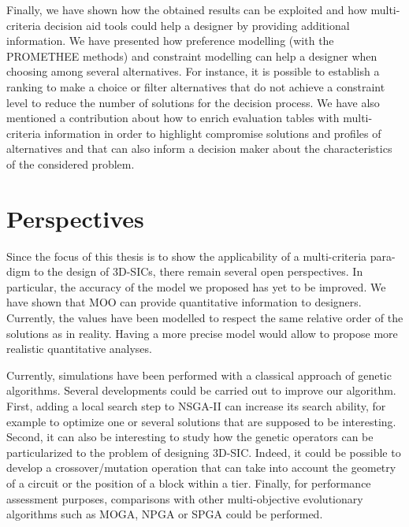 Finally, we have shown how the obtained results can be exploited and how multi-criteria decision aid tools could help a designer by providing additional information. We have presented how preference modelling (with the PROMETHEE methods) and constraint modelling can help a designer when choosing among several alternatives. For instance, it is possible to establish a ranking to make a choice or filter alternatives that do not achieve a constraint level to reduce the number of solutions for the decision process. We have also mentioned a contribution about how to enrich evaluation tables with multi-criteria information in order to highlight compromise solutions and profiles of alternatives and that can also inform a decision maker about the characteristics of the considered problem. %

\section*{Perspectives}

Since the focus of this thesis is to show the applicability of a multi-criteria para\hyp{}digm to the design of 3D-SICs, there remain several open perspectives. In particular, the accuracy of the model we proposed has yet to be improved. We have shown that MOO can provide quantitative information to designers. Currently, the values have been modelled to respect the same relative order of the solutions as in reality. Having a more precise model would allow to propose more realistic quantitative analyses.

Currently, simulations have been performed with a classical approach of genetic algorithms. Several developments could be carried out to improve our algorithm. First, adding a local search step to NSGA-II can increase its search ability, for example to optimize one or several solutions that are supposed to be interesting. Second, it can also be interesting to study how the genetic operators can be particularized to the problem of designing 3D-SIC. Indeed, it could be possible to develop a crossover/mutation operation that can take into account the geometry of a circuit or the position of a block within a tier. Finally, for performance assessment purposes, comparisons with other multi-objective evolutionary algorithms such as MOGA, NPGA or SPGA \cite{Deb:2001:MOU:559152} could be performed.


